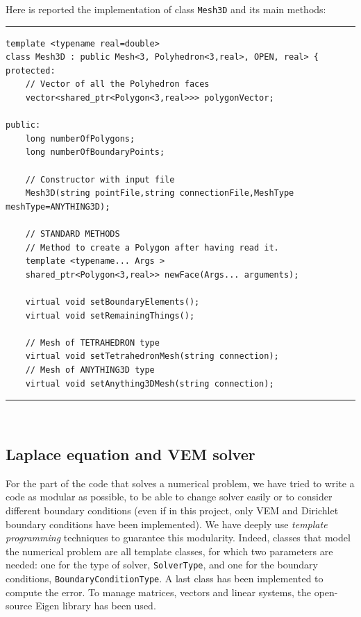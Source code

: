 Here is reported the implementation of class \verb|Mesh3D| and its main methods:

\noindent\rule{12.7cm}{1pt}
\begin{lstlisting}[caption=File \texttt{Mesh3D.h}]
template <typename real=double>
class Mesh3D : public Mesh<3, Polyhedron<3,real>, OPEN, real> {
protected:
    // Vector of all the Polyhedron faces
    vector<shared_ptr<Polygon<3,real>>> polygonVector;  

public:
    long numberOfPolygons;
    long numberOfBoundaryPoints;

    // Constructor with input file
    Mesh3D(string pointFile,string connectionFile,MeshType 
meshType=ANYTHING3D);
	
    // STANDARD METHODS
    // Method to create a Polygon after having read it.
    template <typename... Args >
    shared_ptr<Polygon<3,real>> newFace(Args... arguments);

    virtual void setBoundaryElements();
    virtual void setRemainingThings();

    // Mesh of TETRAHEDRON type
    virtual void setTetrahedronMesh(string connection);
    // Mesh of ANYTHING3D type
    virtual void setAnything3DMesh(string connection);
\end{lstlisting}
\noindent\rule{12.7cm}{1pt}\\

\subsection{Laplace equation and VEM solver}
For the part of the code that solves a numerical problem, we have tried to write a code as modular as possible, to be able to change solver easily or to consider different boundary conditions (even if in this project, only VEM and Dirichlet boundary conditions have been implemented). We have deeply use \textit{template programming} techniques to guarantee this modularity. Indeed, classes that model the numerical problem are all template classes, for which two parameters are needed: one for the type of solver, \verb|SolverType|, and one for the boundary conditions, \verb|BoundaryConditionType|. A last class has been implemented to compute the error. To manage matrices, vectors and linear systems, the open-source Eigen library has been used. 

